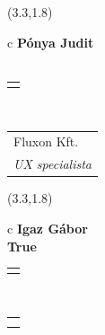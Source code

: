 \documentclass[11pt]{article}
\begin{document}
\makebox(3.3,1.8){
  \renewcommand\arraystretch{1.3}
  \begin{tabular}[c]{c}
    \hspace{8.5mm}
    \LARGE\bf{ Pónya Judit }\\
    \hspace{8.5mm}
    \Large{  }\\
    \renewcommand\arraystretch{3}
    \begin{tabular}[c]{c}
      \centering
      \fontfamily{phv}\selectfont{
        \textbf{
          \textsc{
            \scriptsize{
            \color{Dark}{ Ismerkedő }\color{Bright}{ Webmester }\color{Bright}{ Sminkmester }\color{Bright}{ Programozó }
            }
          }
        }
      }
    \end{tabular}
    \\
    \renewcommand\arraystretch{1}
    \begin{tabular}{p{3.3in}}
      \hspace{.7cm}Fluxon Kft.\\
      \hspace{.7cm}\emph{ UX specialista }\\
    \end{tabular}
  \end{tabular}
}

\makebox(3.3,1.8){
  \renewcommand\arraystretch{1.3}
  \begin{tabular}[c]{c}
    \hspace{8.5mm}
    \LARGE\bf{ Igaz Gábor }\\
    \hspace{8.5mm}
    \Large{ True }\\
    \renewcommand\arraystretch{3}
    \begin{tabular}[c]{c}
      \centering
      \fontfamily{phv}\selectfont{
        \textbf{
          \textsc{
            \scriptsize{
            \color{Dark}{ Ismerkedő }\color{Bright}{ Webmester }\color{Bright}{ Sminkmester }\color{Bright}{ Programozó }
            }
          }
        }
      }
    \end{tabular}
    \\
    \renewcommand\arraystretch{1}
    \begin{tabular}{p{3.3in}}
      \hspace{.7cm}\\
      \hspace{.7cm}\emph{  }\\
    \end{tabular}
  \end{tabular}
}
\end{document}
